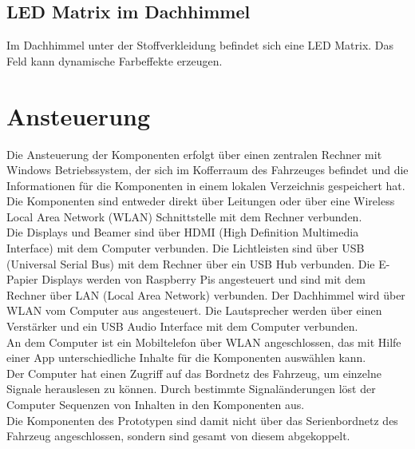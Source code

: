 \subsection{LED Matrix im Dachhimmel}
Im Dachhimmel unter der Stoffverkleidung befindet sich eine LED Matrix. Das Feld kann dynamische Farbeffekte erzeugen.
\section{Ansteuerung}
Die Ansteuerung der Komponenten erfolgt über einen zentralen Rechner mit Windows Betriebssystem, der sich im Kofferraum des Fahrzeuges befindet und die Informationen für die Komponenten in einem lokalen Verzeichnis gespeichert hat. Die Komponenten sind entweder direkt über Leitungen oder über eine Wireless Local Area Network (WLAN) Schnittstelle mit dem Rechner verbunden.\\
Die Displays und Beamer sind über HDMI (High Definition Multimedia Interface) mit dem Computer verbunden. Die Lichtleisten sind über USB (Universal Serial Bus) mit dem Rechner über ein USB Hub verbunden. Die E-Papier Displays werden von Raspberry Pis angesteuert und sind mit dem Rechner über LAN (Local Area Network) verbunden. Der Dachhimmel wird über WLAN vom Computer aus angesteuert. Die Lautsprecher werden über einen Verstärker und ein USB Audio Interface mit dem Computer verbunden.\\
An dem Computer ist ein Mobiltelefon über WLAN angeschlossen, das mit Hilfe einer App unterschiedliche Inhalte für die Komponenten auswählen kann.\\
Der Computer hat einen Zugriff auf das Bordnetz des Fahrzeug, um einzelne Signale herauslesen zu können. Durch bestimmte Signaländerungen löst der Computer Sequenzen von Inhalten in den Komponenten aus.\\
Die Komponenten des Prototypen sind damit nicht über das Serienbordnetz des Fahrzeug angeschlossen, sondern sind gesamt von diesem abgekoppelt.